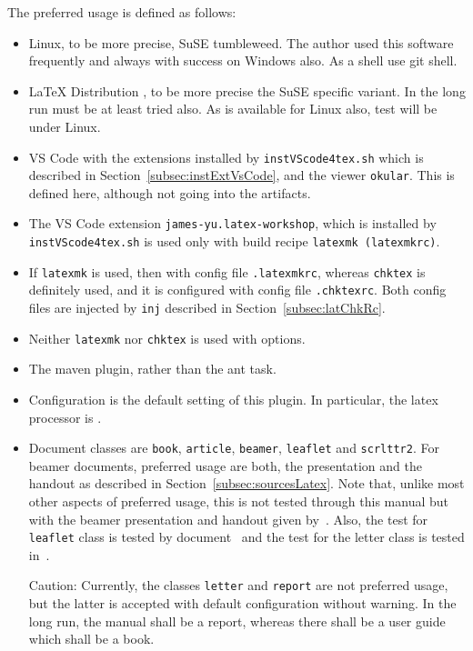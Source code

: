 \documentclass[a4paper,12pt,german,english]{book}
\begin{document}
The preferred usage is defined as follows: 
%
\begin{itemize}
  \item Linux, to be more precise, SuSE tumbleweed. 
  The author used this software frequently and always with success on Windows also. 
  As a shell use git shell. 
  \item \LaTeX{} Distribution \texlive, to be more precise the SuSE specific variant. 
  In the long run \miktex{} must be at least tried also. 
  As \miktex{} is available for Linux also, test will be under Linux. 
  \item 
  VS Code with the extensions installed by \texttt{instVScode4tex.sh} 
  which is described in Section~\ref{subsec:instExtVsCode}, 
  and the viewer \texttt{okular}. 
  This is defined here, although not going into the artifacts. 
  \item The VS Code extension \texttt{james-yu.latex-workshop}, 
  which is installed by \texttt{instVScode4tex.sh} is used only with build recipe 
  \texttt{latexmk (latexmkrc)}. 
  \item If \texttt{latexmk} is used, then with config file \texttt{.latexmkrc}, 
  whereas \texttt{chktex} is definitely used, 
  and it is configured with config file \texttt{.chktexrc}. 
  Both config files are injected by \texttt{inj} described in Section~\ref{subsec:latChkRc}. 
  \item Neither \texttt{latexmk} nor \texttt{chktex} is used with options. 
  \item The maven plugin, rather than the ant task. 
  \item Configuration is the default setting of this plugin. 
  In particular, the latex processor is \lualatex. 
  \item Document classes are \texttt{book}, \texttt{article}, 
  \texttt{beamer}, \texttt{leaflet} and \texttt{scrlttr2}. 
  For beamer documents, preferred usage are both, the presentation and the handout 
  as described in Section~\ref{subsec:sourcesLatex}. 
  Note that, unlike most other aspects of preferred usage, 
  this is not tested through this manual 
  but with the beamer presentation and handout given by~\cite{PresBeamer}. 
  Also, the test for \texttt{leaflet} class is tested by document~\cite{LeafLeaf} 
  and the test for the letter class is tested in~\cite{LetScrlttr2}. 

  Caution: Currently, the classes \texttt{letter} and \texttt{report} 
  are not preferred usage, 
  but the latter is accepted with default configuration without warning. 
  In the long run, the manual shall be a report, whereas there shall be a user guide 
  which shall be a book. 
  

\end{itemize}
\end{document}
